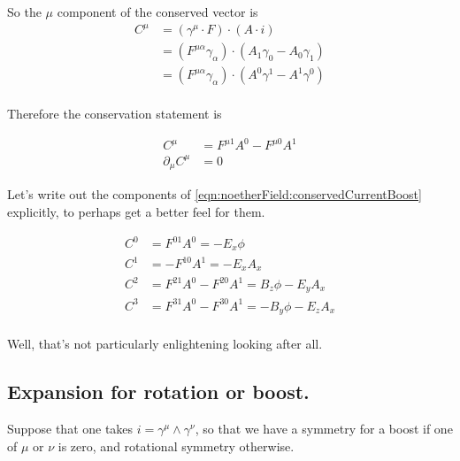 So the $\mu$ component of the conserved vector is
\begin{align*}
C^\mu 
&= (\gamma^\mu \cdot F) \cdot (A \cdot i) \\
&= (F^{\mu\alpha} \gamma_\alpha) \cdot (A_1 \gamma_0 - A_0 \gamma_1) \\
&= (F^{\mu\alpha} \gamma_\alpha) \cdot (A^0 \gamma^1 - A^1 \gamma^0) \\
\end{align*}

Therefore the conservation statement is
%

\begin{align}\label{eqn:noetherField:conservedCurrentBoost}
C^\mu &= F^{\mu 1} A^0 - F^{\mu 0} A^1 \\
\partial_\mu C^\mu &= 0
\end{align}

Let's write out the components of \ref{eqn:noetherField:conservedCurrentBoost} explicitly, to perhaps get a better feel for them.

\begin{align*}
C^0 &= F^{0 1} A^0 = -E_x \phi \\
C^1 &= - F^{1 0} A^1 = -E_x A_x \\
C^2 &= F^{2 1} A^0 - F^{2 0} A^1 = B_z \phi - E_y A_x \\
C^3 &= F^{3 1} A^0 - F^{3 0} A^1 = -B_y \phi - E_z A_x \\
\end{align*}

Well, that's not particularly enlightening looking after all.

\subsection{Expansion for rotation or boost. }

Suppose that one takes $i = \gamma^{\mu} \wedge \gamma^{\nu}$, so that we have a symmetry for a boost if one of $\mu$ or $\nu$ is zero,
and rotational symmetry otherwise.

